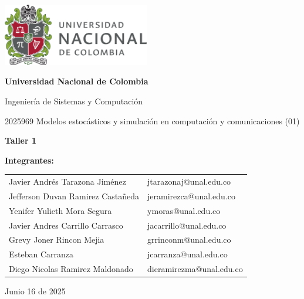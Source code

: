 \documentclass{article}
\begin{document}
\begin{titlepage}
    \centering
    \includegraphics[width=0.48\textwidth]{logo_universidad.png}
    \par\vspace{2cm}

    {\Large \textbf{Universidad Nacional de Colombia} \par}
    \vspace{0.5cm}
    {\large Ingeniería de Sistemas y Computación \par}
    {\large 2025969 Modelos estocásticos y simulación en computación y comunicaciones (01)\par}
    \vspace{3cm}

    {\large \textbf{Taller 1} \par}
    \vspace{3cm}

    {\large \textbf{Integrantes:} \par}
    \vspace{0.5cm}
    \begin{tabular}{ll}
    Javier Andrés Tarazona Jiménez & jtarazonaj@unal.edu.co \\
    Jefferson Duvan Ramirez Castañeda & jeramirezca@unal.edu.co \\
    Yenifer Yulieth Mora Segura & ymoras@unal.edu.co \\
    Javier Andres Carrillo Carrasco & jacarrillo@unal.edu.co \\
    Grevy Joner Rincon Mejia & grrinconm@unal.edu.co \\
    Esteban Carranza & jcarranza@unal.edu.co \\
    Diego Nicolas Ramirez Maldonado & dieramirezma@unal.edu.co \\
    \end{tabular}
    \par\vspace{3cm}

    {\large Junio 16 de 2025 \par}
\end{titlepage}
\end{document}
